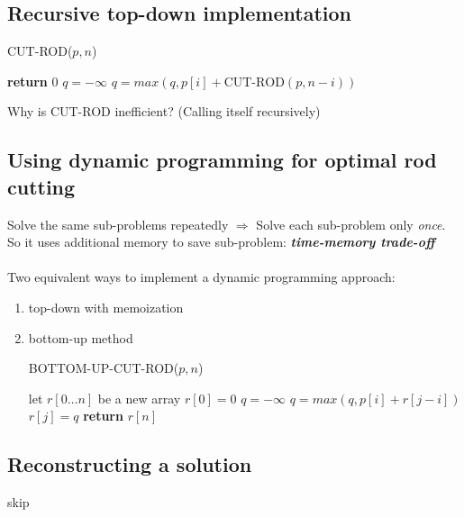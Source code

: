\documentclass[a4paper]{article}
\begin{document}
\subsection*{Recursive top-down implementation}
\begin{algorithm}[H]%
    \caption{CUT-ROD($p,n$)}
    \begin{algorithmic}[1] %
            \State \textbf{return }$0$
        \EndIf
        \State $q=-\infty$
        \State $q=max(q,p[i]+\text{CUT-ROD}(p,n-i))$
        \EndFor
    \end{algorithmic}
\end{algorithm}
Why is CUT-ROD inefficient? (Calling itself recursively)

\subsection*{Using dynamic programming for optimal rod cutting}
Solve the same sub-problems repeatedly $\Rightarrow$ Solve each sub-problem only \textit{once}.\\
So it uses additional memory to save sub-problem: \textbf{\textit{time-memory trade-off}}\\
\\
Two equivalent ways to implement a dynamic programming approach:
\begin{enumerate}
    \item top-down with memoization
    \item bottom-up method
    \begin{algorithm}[H]%
    \caption{BOTTOM-UP-CUT-ROD($p,n$)}
    \begin{algorithmic}[1] %
        \State let $r[0\ldots n]$ be a new array
        \State $r[0]=0$
            \State $q=-\infty$
            \State $q=max(q,p[i]+r[j-i])$
            \EndFor
            \State $r[j]=q$
        \EndFor
        \State \textbf{return} $r[n]$
    \end{algorithmic}
\end{algorithm}
\end{enumerate}

\subsection*{Reconstructing a solution}
skip
\end{document}
